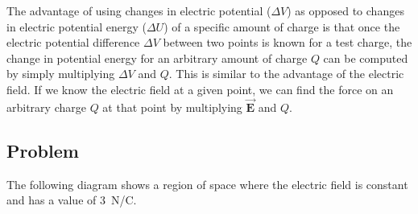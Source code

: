 \documentclass{article}
\newcommand{\bfvec}[1]{\vec{\mathbf{#1}}}
\begin{document}
The advantage of using changes in electric potential ($\Delta V$) as opposed to changes in electric potential energy ($\Delta U$) of a specific amount of charge is that once the electric potential difference $\Delta V$ between two points is known for a test charge, the change in potential energy for an arbitrary amount of charge $Q$ can be computed by simply multiplying $\Delta V$ and $Q$. This is similar to the advantage of the electric field. If we know the electric field at a given point, we can find the force on an arbitrary charge $Q$ at that point by multiplying $\bfvec{E}$ and $Q$.

\newpage

\subsection{Problem}

The following diagram shows a region of space where the electric field is constant and has a value of $3$ N/C. 


\end{document}
